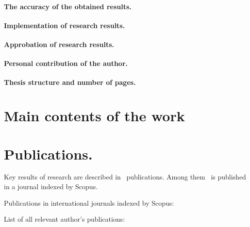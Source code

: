 \paragraph*{The accuracy of the obtained results.}

\paragraph*{Implementation of research results.}
\paragraph*{Approbation of research results.}
\paragraph*{Personal contribution of the author.}
\paragraph*{Thesis structure and number of pages.}

\newpage
\section*{Main contents of the work}

\section*{Publications.}

Key results of research are described in \theAllMyPapers~publications.
Among them
\theScopusPapers~is published in a journal indexed by Scopus.



Publications in international journals indexed by Scopus:
\begin{refsection}
\nocite{*}
\printbibliography[
    keyword=scopus,
    heading=none,
    resetnumbers=true
]
\end{refsection}


List of all relevant author's publications:
\begin{refsection}
\nocite{*}
\printbibliography[
    keyword=own,
    heading=none,
    resetnumbers=true
]
\end{refsection}
